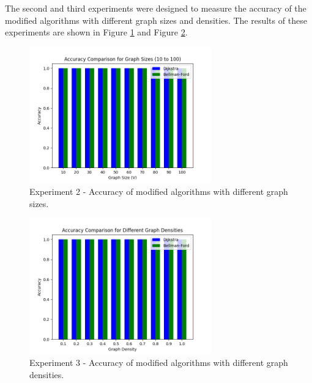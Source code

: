 \documentclass{article}
\begin{document}
\begin{onehalfspace}
\indent The second and third experiments were designed to measure the accuracy of the modified algorithms with different graph sizes and densities. The results of these experiments are shown in Figure \ref{fig:Figure 2} and Figure \ref{fig:Figure 3}.

\begin{figure}[H] 
    \centering
    \includegraphics[width=0.7\textwidth]{Figures/Accuracy_sizes.png} 
    \caption{\footnotesize Experiment 2 - Accuracy of modified algorithms with different graph sizes.}
    \label{fig:Figure 2} 
\end{figure}

\begin{figure}[H] 
    \centering
    \includegraphics[width=0.7\textwidth]{Figures/Accuracies_densities.png} 
    \caption{\footnotesize Experiment 3 - Accuracy of modified algorithms with different graph densities.}
    \label{fig:Figure 3} 
\end{figure}


\end{onehalfspace}
\end{document}
